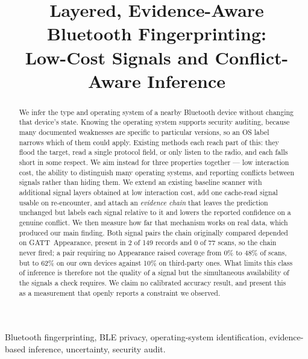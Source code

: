 \documentclass[conference]{IEEEtran}
\begin{document}
\title{Layered, Evidence-Aware Bluetooth Fingerprinting:\\
Low-Cost Signals and Conflict-Aware Inference}

\author{
}

\maketitle

\begin{abstract}
We infer the type and operating system of a nearby Bluetooth device without
changing that device's state. Knowing the operating system supports security
auditing, because many documented weaknesses are specific to particular
versions, so an OS label narrows which of them could apply. Existing methods
each reach part of this: they flood the target, read a single protocol field,
or only listen to the radio, and each falls short in some respect. We aim
instead for three properties together --- low interaction cost, the ability to
distinguish many operating systems, and reporting conflicts between signals
rather than hiding them. We extend an existing baseline scanner with
additional signal layers obtained at low interaction cost, add one cache-read
signal usable on re-encounter, and attach an \emph{evidence chain} that leaves
the prediction unchanged but labels each signal relative to it and lowers the
reported confidence on a genuine conflict. We then measure how far that
mechanism works on real data, which produced our main finding. Both signal
pairs the chain originally compared depended on GATT~Appearance, present in 2
of 149 records and 0 of 77 scans, so the chain never fired; a pair requiring
no Appearance raised coverage from 0\% to 48\% of scans, but to 62\% on our
own devices against 10\% on third-party ones. What limits this class of
inference is therefore not the quality of a signal but the simultaneous
availability of the signals a check requires. We claim no calibrated accuracy
result, and present this as a measurement that openly reports a constraint we
observed.
\end{abstract}

\begin{IEEEkeywords}
Bluetooth fingerprinting, BLE privacy, operating-system identification,
evidence-based inference, uncertainty, security audit.
\end{IEEEkeywords}
\end{document}
